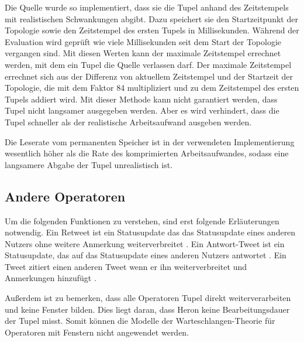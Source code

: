 Die Quelle wurde so implementiert, dass sie die Tupel anhand des Zeitstempels mit realistischen Schwankungen abgibt.
Dazu speichert sie den Startzeitpunkt der Topologie sowie den Zeitstempel des ersten Tupels in Millisekunden.
Während der Evaluation wird geprüft wie viele Millisekunden seit dem Start der Topologie vergangen sind.
Mit diesen Werten kann der maximale Zeitstempel errechnet werden, mit dem ein Tupel die Quelle verlassen darf.
Der maximale Zeitstempel errechnet sich aus der Differenz von aktuellem Zeitstempel und der Startzeit der Topologie, die mit dem Faktor 84 multipliziert und zu dem Zeitstempel des ersten Tupels addiert wird.
Mit dieser Methode kann nicht garantiert werden, dass Tupel nicht langsamer ausgegeben werden.
Aber es wird verhindert, dass die Tupel schneller als der realistische Arbeitsaufwand ausgeben werden.

Die Leserate vom permanenten Speicher ist in der verwendeten Implementierung wesentlich höher als die Rate des komprimierten Arbeitsaufwandes, sodass eine langsamere Abgabe der Tupel unrealistisch ist.

\subsection{Andere Operatoren}

Um die folgenden Funktionen zu verstehen, sind erst folgende Erläuterungen notwendig.
Ein Retweet ist ein Statusupdate das das Statusupdate eines anderen Nutzers ohne weitere Anmerkung weiterverbreitet \cite{noauthor_docs_nodate}.
Ein Antwort-Tweet ist ein Statusupdate, das auf das Statusupdate eines anderen Nutzers antwortet \cite{noauthor_docs_nodate}.
Ein Tweet zitiert einen anderen Tweet wenn er ihn weiterverbreitet und Anmerkungen hinzufügt \cite{noauthor_docs_nodate}.

Außerdem ist zu bemerken, dass alle Operatoren Tupel direkt weiterverarbeiten und keine Fenster bilden.
Dies liegt daran, dass Heron keine Bearbeitungsdauer der Tupel misst.
Somit können die Modelle der Warteschlangen-Theorie für Operatoren mit Fenstern nicht angewendet werden.

